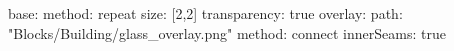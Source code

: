 base:
  method: repeat
  size: [2,2]
  transparency: true
overlay:
  path: "Blocks/Building/glass_overlay.png"
  method: connect
  innerSeams: true